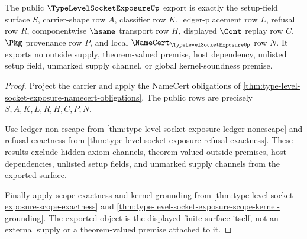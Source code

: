 \begin{theorem}
\label{thm:type-level-socket-exposure-public-export}
The public $\TypeLevelSocketExposureUp$ export is exactly the setup-field surface $S$, carrier-shape row $A$, classifier row $K$, ledger-placement row $L$, refusal row $R$, componentwise $\hsame$ transport row $H$, displayed $\Cont$ replay row $C$, $\Pkg$ provenance row $P$, and local $\NameCert_{\TypeLevelSocketExposureUp}$ row $N$. It exports no outside supply, theorem-valued premise, host dependency, unlisted setup field, unmarked supply channel, or global kernel-soundness premise.
\end{theorem}
\begin{proof}
Project the carrier and apply the NameCert obligations of \autoref{thm:type-level-socket-exposure-namecert-obligations}. The public rows are precisely $S,A,K,L,R,H,C,P,N$.

Use ledger non-escape from \autoref{thm:type-level-socket-exposure-ledger-nonescape} and refusal exactness from \autoref{thm:type-level-socket-exposure-refusal-exactness}. These results exclude hidden axiom channels, theorem-valued outside premises, host dependencies, unlisted setup fields, and unmarked supply channels from the exported surface.

Finally apply scope exactness and kernel grounding from \autoref{thm:type-level-socket-exposure-scope-exactness} and \autoref{thm:type-level-socket-exposure-scope-kernel-grounding}. The exported object is the displayed finite surface itself, not an external supply or a theorem-valued premise attached to it.
\end{proof}


\begin{closurestatus}{\TypeLevelSocketExposureUp}
  \theoryclosure{\publicClosure}
  \formalstatus{\unformalizedV}
\end{closurestatus}
